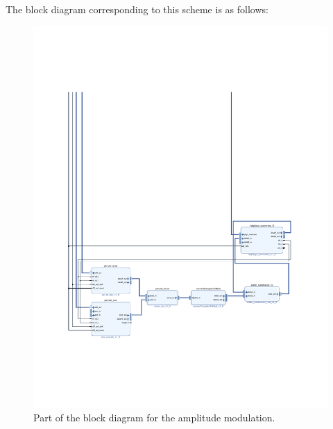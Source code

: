 \documentclass[12pt,oneside]{article}
\begin{document}
The block diagram corresponding to this scheme is as follows:

\begin{figure}[h!tb]
	\begin{center}
		\includegraphics[width=16cm,trim={2.5cm 5cm 2.5cm 14cm}, clip]{design/mod_ampl.pdf}
		\caption{Part of the block diagram for the amplitude modulation.}
		\label{fig:mod_ampl}
	\end{center}
\end{figure}

\newpage
\end{document}
